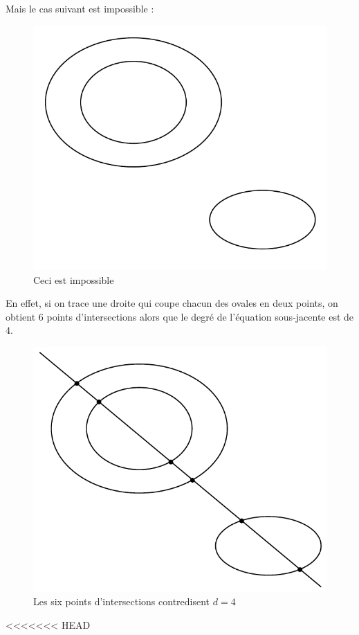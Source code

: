 \documentclass{livre}
\begin{document}
Mais le cas suivant est impossible :
\begin{figure}[H]
\begin{center}
\includegraphics[scale=0.6]{fig2}
\end{center}
\caption{Ceci est impossible}
\end{figure}
En effet, si on trace une droite qui coupe chacun des ovales en deux points, on obtient $6$ points d'intersections alors que le degré de l'équation sous-jacente est de $4$.
\begin{figure}[H]
\begin{center}
\includegraphics[scale=0.55]{fig3}
\end{center}
\caption{Les six points d'intersections contredisent $d=4$}
\end{figure}

<<<<<<< HEAD
\end{document}
